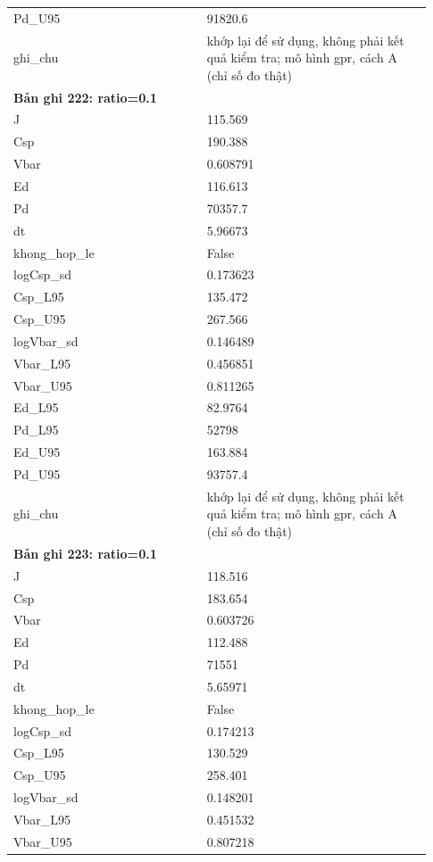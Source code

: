 \begin{longtable}{p{0.43\linewidth}p{0.50\linewidth}}
Pd\_\allowbreak U95 & 91820.6 \\
ghi\_\allowbreak chu & khớp lại để sử dụng, không phải kết quả kiểm tra; mô hình gpr, cách A (chỉ số đo thật) \\
\midrule
\multicolumn{2}{p{0.95\linewidth}}{\textbf{Bản ghi 222: ratio=0.1}} \\
J & 115.569 \\
Csp & 190.388 \\
Vbar & 0.608791 \\
Ed & 116.613 \\
Pd & 70357.7 \\
dt & 5.96673 \\
khong\_\allowbreak hop\_\allowbreak le & False \\
logCsp\_\allowbreak sd & 0.173623 \\
Csp\_\allowbreak L95 & 135.472 \\
Csp\_\allowbreak U95 & 267.566 \\
logVbar\_\allowbreak sd & 0.146489 \\
Vbar\_\allowbreak L95 & 0.456851 \\
Vbar\_\allowbreak U95 & 0.811265 \\
Ed\_\allowbreak L95 & 82.9764 \\
Pd\_\allowbreak L95 & 52798 \\
Ed\_\allowbreak U95 & 163.884 \\
Pd\_\allowbreak U95 & 93757.4 \\
ghi\_\allowbreak chu & khớp lại để sử dụng, không phải kết quả kiểm tra; mô hình gpr, cách A (chỉ số đo thật) \\
\midrule
\multicolumn{2}{p{0.95\linewidth}}{\textbf{Bản ghi 223: ratio=0.1}} \\
J & 118.516 \\
Csp & 183.654 \\
Vbar & 0.603726 \\
Ed & 112.488 \\
Pd & 71551 \\
dt & 5.65971 \\
khong\_\allowbreak hop\_\allowbreak le & False \\
logCsp\_\allowbreak sd & 0.174213 \\
Csp\_\allowbreak L95 & 130.529 \\
Csp\_\allowbreak U95 & 258.401 \\
logVbar\_\allowbreak sd & 0.148201 \\
Vbar\_\allowbreak L95 & 0.451532 \\
Vbar\_\allowbreak U95 & 0.807218 \\

\end{longtable}
